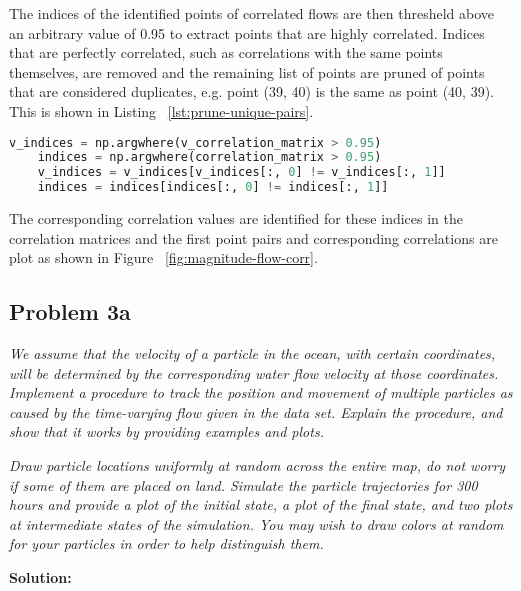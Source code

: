 \documentclass[11pt]{article}
\newcommand{\question}[1]{\textit{#1}}
\begin{document}
The indices of the identified points of correlated flows are then thresheld above an arbitrary value of 0.95 to extract points that are highly correlated. Indices that are perfectly correlated, such as correlations with the same points themselves, are removed and the remaining list of points are pruned of points that are considered duplicates, e.g. point (39, 40) is the same as point (40, 39). This is shown in Listing ~\ref{lst:prune-unique-pairs}.

\begin{lstlisting}[language=Python, label=lst:prune-unique-pairs, caption={Removing duplicate points and perfect correlations.}]
    v_indices = np.argwhere(v_correlation_matrix > 0.95)
    indices = np.argwhere(correlation_matrix > 0.95)
    v_indices = v_indices[v_indices[:, 0] != v_indices[:, 1]]
    indices = indices[indices[:, 0] != indices[:, 1]]
\end{lstlisting}

The corresponding correlation values are identified for these indices in the correlation matrices and the first point pairs and corresponding correlations are plot as shown in Figure ~\ref{fig:magnitude-flow-corr}. 

\vspace{1em}

\subsection{Problem 3a}
\question{We assume that the velocity of a particle in the ocean, with certain coordinates, will be determined by the corresponding water flow velocity at those coordinates. Implement a procedure to track the position and movement of multiple particles as caused by the time-varying flow given in the data set. Explain the procedure, and show that it works by providing examples and plots.
}

\vspace{1em}

\question{Draw particle locations uniformly at random across the entire map, do not worry if some of them are placed on land. Simulate the particle trajectories for 300 hours and provide a plot of the initial state, a plot of the final state, and two plots at intermediate states of the simulation. You may wish to draw colors at random for your particles in order to help distinguish them. 
}

\textbf{Solution:} \\
\end{document}
